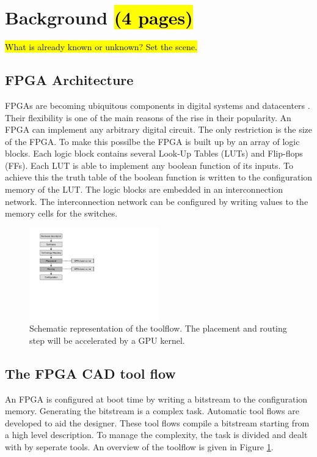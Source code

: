 \documentclass[a4paper,oneside,12pt]{article}
\begin{document}
\newpage

\section{Background \hl{(4 pages)}}
\label{background}
\hl{What is already known or unknown? Set the scene.}
\subsection{FPGA Architecture}
FPGAs are becoming ubiquitous components in digital systems and datacenters \cite{ovtcharov2015accelerating,putnam2015reconfigurable}. Their flexibility is one of the main reasons of the rise in their popularity. An FPGA can implement any arbitrary digital circuit. The only restriction is the size of the FPGA. To make this possilbe the FPGA is built up by an array of logic blocks. Each logic block contains several Look-Up Tables (LUTs) and Flip-flops (FFs). Each LUT is able to implement any boolean function of its inputs. To achieve this the truth table of the boolean function is written to the configuration memory of the LUT. The logic blocks are embedded in an interconnection network. The interconnection network can be configured by writing values to the memory cells for the switches.

\begin{figure}[t]
\centering
\includegraphics[width = 0.50\textwidth,trim = 0mm 90mm 140mm 2mm, clip]{toolflow}
\caption{Schematic representation of the toolflow. The placement and routing step will be accelerated by a GPU kernel.}
\label{toolflow}
\end{figure}

\subsection{The FPGA CAD tool flow}

An FPGA is configured at boot time by writing a bitstream to the configuration memory. Generating the bitstream is a complex task. Automatic tool flows are developed to aid the designer. These tool flows compile a bitstream starting from a high level description. To manage the complexity, the task is divided and dealt with by seperate tools. An overview of the toolflow is given in Figure \ref{toolflow}. 
\end{document}
